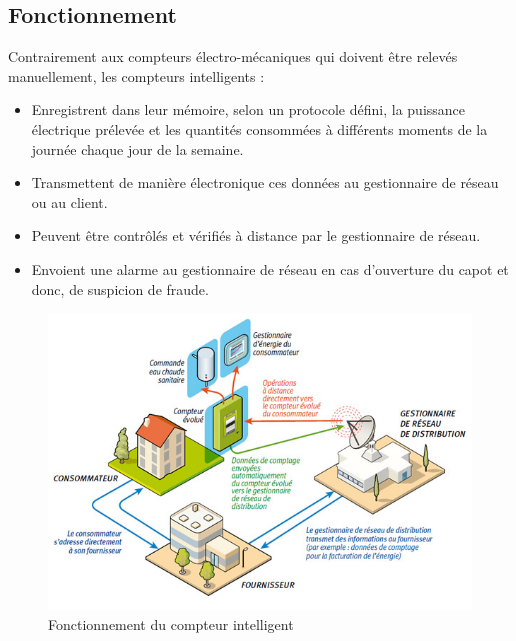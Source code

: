 \subsection{Fonctionnement}
Contrairement aux compteurs électro-mécaniques qui doivent être relevés manuellement, les compteurs intelligents :

\begin{itemize}[label=\textbullet]
\item Enregistrent dans leur mémoire, selon un protocole défini, la puissance électrique prélevée et les quantités consommées à différents moments de la journée chaque jour de la semaine.
\item Transmettent de manière électronique ces données au gestionnaire de réseau  ou au client.
\item Peuvent être contrôlés et vérifiés à distance par le gestionnaire de réseau.
\item Envoient une alarme au gestionnaire de réseau en cas d’ouverture du capot et donc, de suspicion de fraude.
\end{itemize}

\begin{figure}[h]
	\centering
    \includegraphics[scale=0.6]{img/part2/1.5}
    \caption{Fonctionnement du compteur intelligent}
\end{figure}